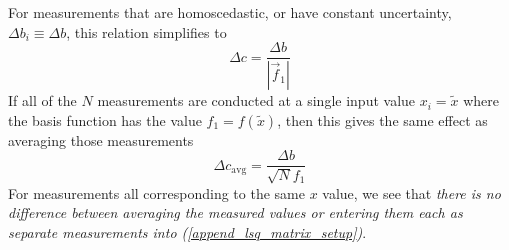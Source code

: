 For measurements that are homoscedastic, or have constant uncertainty, $\Delta b_i \equiv \Delta b$, this relation simplifies to
\begin{equation}
	\boxed{\Delta c = \frac{\Delta b}{\left|\vec{f}_1\right|}}
\end{equation}
If all of the $N$ measurements are conducted at a single input value $x_i = \tilde{x}$ where the basis function has the value $f_1 = f(\tilde{x})$, then this gives the same effect as averaging those measurements
\begin{equation}
	\boxed{\Delta c_\mathrm{avg} = \frac{\Delta b}{\sqrt{N} f_1}}
\end{equation}
For measurements all corresponding to the same $x$ value, we see that \textit{there is no difference between averaging the measured values or entering them each as separate measurements into (\ref{append_lsq_matrix_setup})}.	


